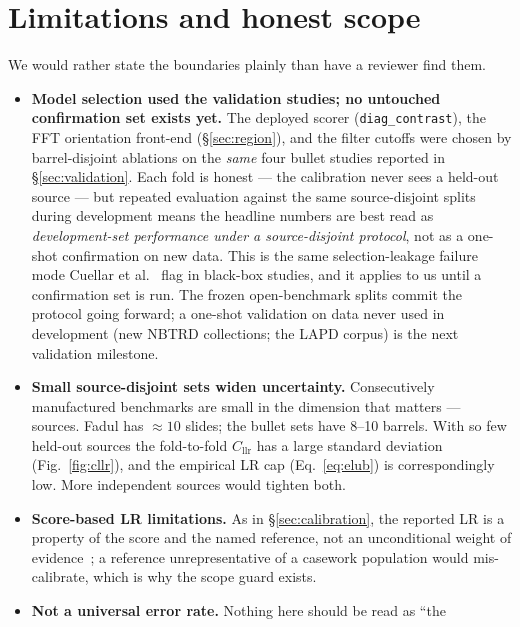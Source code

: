 \documentclass[11pt]{article}
\newcommand{\Cllr}{C_{\mathrm{llr}}}
\newcommand{\diagcontrast}{\texttt{diag\_contrast}}
\begin{document}
\section{Limitations and honest scope}
\label{sec:limits}

We would rather state the boundaries plainly than have a reviewer find them.

\begin{itemize}
  \item \textbf{Model selection used the validation studies; no untouched
        confirmation set exists yet.} The deployed scorer (\diagcontrast), the
        FFT orientation front-end (\S\ref{sec:region}), and the filter cutoffs
        were chosen by barrel-disjoint ablations on the \emph{same} four bullet
        studies reported in \S\ref{sec:validation}. Each fold is honest --- the
        calibration never sees a held-out source --- but repeated evaluation
        against the same source-disjoint splits during development means the
        headline numbers are best read as \emph{development-set performance under
        a source-disjoint protocol}, not as a one-shot confirmation on new data.
        This is the same selection-leakage failure mode Cuellar et
        al.~\cite{cuellar2024} flag in black-box studies, and it applies to us
        until a confirmation set is run. The frozen open-benchmark splits commit
        the protocol going forward; a one-shot validation on data never used in
        development (new NBTRD collections; the LAPD corpus) is the next
        validation milestone.
  \item \textbf{Small source-disjoint sets widen uncertainty.} Consecutively
        manufactured benchmarks are small in the dimension that matters --- sources.
        Fadul has $\approx\!10$ slides; the bullet sets have 8--10 barrels. With so
        few held-out sources the fold-to-fold $\Cllr$ has a large standard deviation
        (Fig.~\ref{fig:cllr}), and the empirical LR cap (Eq.~\ref{eq:elub}) is
        correspondingly low. More independent sources would tighten both.
  \item \textbf{Score-based LR limitations.} As in \S\ref{sec:calibration}, the
        reported LR is a property of the score and the named reference, not an
        unconditional weight of evidence~\cite{hepler2012,neumann2020}; a reference
        unrepresentative of a casework population would mis-calibrate, which is why
        the scope guard exists.
  \item \textbf{Not a universal error rate.} Nothing here should be read as ``the

\end{itemize}
\end{document}
